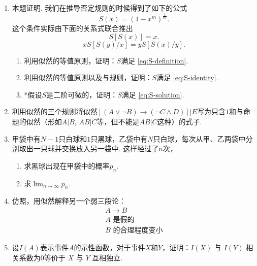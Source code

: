 \begin{enumerate}[wide, labelindent=0pt]
    
    \item \label{exercise:derive-S} \cite{coxProbabilityFrequencyReasonable1946} 本题证明. 我们在推导否定规则的时候得到了如下的公式
    \begin{equation}
        S(x) = (1-x^m)^\frac{1}{m}. \label{eq:S-solution}
    \end{equation}
    这个条件实际由下面的关系式联合推出
    \begin{equation}
        S[S(x)] = x. \label{eq:S-definition}
    \end{equation}
    \begin{equation}
        x S[S(y)/x] = y S[S(x)/y]. \label{eq:S-identity}
    \end{equation}
    \begin{enumerate}
        \item 利用似然的等值原则，证明：$S$满足 \eqref{eq:S-definition}.
        \item 利用似然的等值原则以及与规则，证明：$S$满足 \eqref{eq:S-identity}.
        \item *假设$S$是二阶可微的，证明：$S$满足 \eqref{eq:S-solution}.
    \end{enumerate}
    
    \item 利用似然的三个规则将似然$[(A \vee \neg B) \to (\neg C \wedge D)]  |  E$写为只含$1$和与命题的似然（形如$A|B$, $AB|C$等，但不能是$\bar{A}B|C$这种）的式子.

    \item 甲袋中有$N-1$只白球和$1$只黑球，乙袋中有$N$只白球，每次从甲、乙两袋中分别取出一只球并交换放入另一袋中. 这样经过了$n$次，
        \begin{enumerate}
            \item   求黑球出现在甲袋中的概率$p_n$.
            \item   求$\lim_{n\to\infty}p_n$.
        \end{enumerate}
    
    \item 仿照，用似然解释另一个弱三段论：
    \[
    \begin{array}{c}  
        A \to B \\ A\text{ 是假的} \\ \hline B\text{ 的合理程度变小}
    \end{array}
    \]

    \item 设$I(A)$表示事件$A$的示性函数，对于事件$X$和$Y$，证明：$I(X)$ 与 $I(Y)$ 相关系数为$0$等价于 $X$ 与 $Y$ 互相独立.


\end{enumerate}
